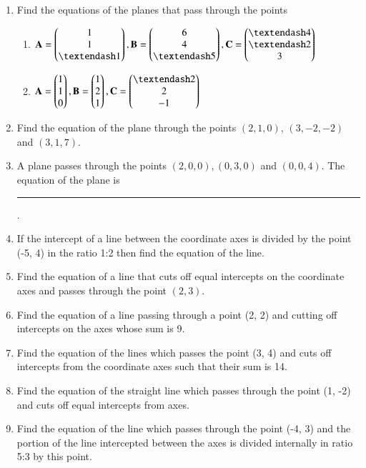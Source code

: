 \begin{enumerate}[label=\thesubsection.\arabic*, ref=\thesubsection.\theenumi]
\label{chapters/11/10/2/9}
\\
\solution

	\item Find the equations of the planes that pass through the points
\begin{enumerate}
\item $\vec{A}= \myvec{1\\1\\– 1},  \vec{B}=\myvec{6\\4\\– 5}, \vec{C}= \myvec{– 4\\– 2\\3}$
\item $\vec{A}= \myvec{1\\1\\0},  \vec{B}= \myvec{1\\2\\1},  \vec{C}= \myvec{– 2\\2\\-1}$
\end{enumerate}
    \solution
		
\item Find the equation of the plane through the points $(2, 1, 0)$,  $(3, -2, -2)$ and $(3, 1, 7)$.
\item A plane passes through the points $(2, 0, 0),  (0, 3, 0)$ and $(0, 0, 4)$. The equation of the plane is \noindent\rule{2cm}{0.4pt}.
\item If the intercept of a line between the coordinate axes is divided by the point (-5, 4) in the ratio 1:2 then find the equation of the line.
\item Find the equation of a line that cuts off equal intercepts on the coordinate axes and passes through the point $(2, 3)$.  
	\\
\solution 
\label{chapters/11/10/2/12}

\item 
Find the equation of a line passing through a point (2, 2) and cutting off intercepts on the axes whose sum is 9.
\label{chapters/11/10/2/13}
	\\
	\solution 

\item Find the equation of the lines which passes the point (3, 4) and cuts off intercepts from the coordinate axes such that their sum is 14.
\item Find the equation of the straight line which passes through the point (1,  -2) and cuts off equal intercepts from axes.
\item Find the equation of the line which passes through the point (-4, 3) and the portion of the line intercepted between the axes is divided internally in ratio 5:3 by this point.

\end{enumerate}
